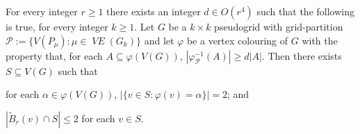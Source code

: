 \documentclass{patmorin}
\DeclareMathOperator{\VE}{\mathit{VE}}
\begin{document}
\begin{lem}\label{doubled_colour_set}
  For every integer $r\ge 1$ there exists an integer $d\in O(r^4)$ such that the following is true, for every integer $k\ge 1$.
  Let $G$ be a $k\times k$ pseudogrid with grid-partition $\mathcal{P}:=\{V(P_\mu):\mu\in\VE(G_k)\}$ and let $\varphi$ be a vertex colouring of $G$ with the property that, for each $A\subseteq\varphi(V(G))$, $|\varphi_{\mathcal{P}}^{-1}(A)|\ge d|A|$.
  Then there exists $S\subseteq V(G)$ such that
  \begin{compactenum}[(i)]
    \item \label{hits_both} for each $\alpha\in\varphi(V(G))$, $|\{v\in S:\varphi(v)=\alpha\}|= 2$; and
    \item \label{spread_out} $|\tilde{B}_r(v)\cap S|\le 2$ for each $v\in S$.
  \end{compactenum}
\end{lem}
\end{document}
